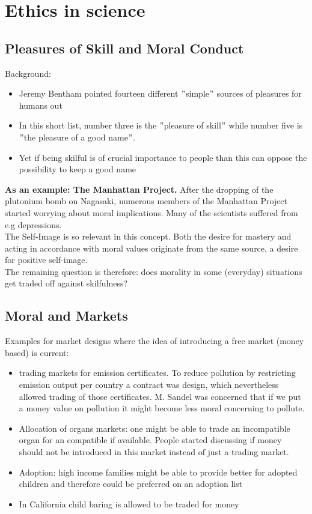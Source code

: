 

\chapter{Ethics in science}

\section{Pleasures of Skill and Moral Conduct}

Background:
\begin{itemize}
	\item Jeremy Bentham pointed fourteen different $"$simple$"$ sources of pleasures for humans out
	\item In this short list, number three is the $"$pleasure of skill$"$ while number five is $"$the pleasure of a good name$"$.
	\item Yet if being skilful is of crucial importance to people than this can oppose the possibility to keep a good name
\end{itemize}
  
  
  
\textbf{As an example: The Manhattan Project.} After the dropping of the plutonium bomb on Nagasaki, numerous members of the Manhattan Project started worrying about moral implications. Many of the scientists suffered from e.g depressions. \\ 

The Self-Image is so relevant in this concept. Both the desire for mastery and acting in accordance with moral values originate from the same source, a desire for positive self-image. \\ 

The remaining question is therefore: does morality in some (everyday) situations get traded off against skilfulness?


\section{Moral and Markets}

Examples for market designs where the idea of introducing a free market (money based) is current:
\begin{itemize}
	\item trading markets for emission certificates. To reduce pollution by restricting emission output per country a contract was design, which nevertheless allowed trading of those certificates. M. Sandel was concerned that if we put a money value on pollution it might become less moral concerning to pollute.
	\item Allocation of organs markets: one might be able to trade an incompatible organ for an compatible if available. People started discussing if money should not be introduced in this market instead of just a trading market.
	\item Adoption: high income families might be able to provide better for adopted children and therefore could be preferred on an adoption list
	\item In California child baring is allowed to be traded for money 
\end{itemize}

